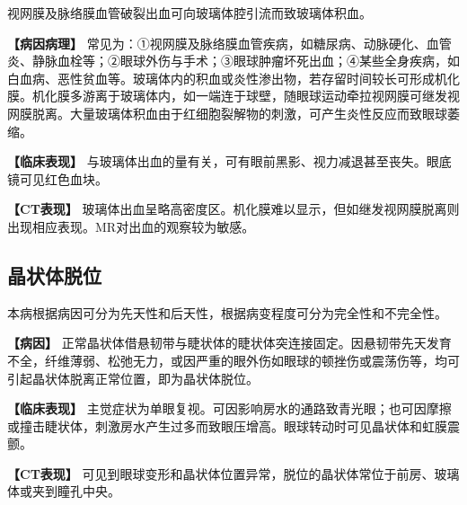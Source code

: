 视网膜及脉络膜血管破裂出血可向玻璃体腔引流而致玻璃体积血。

\textbf{【病因病理】}
常见为：①视网膜及脉络膜血管疾病，如糖尿病、动脉硬化、血管炎、静脉血栓等；②眼球外伤与手术；③眼球肿瘤坏死出血；④某些全身疾病，如白血病、恶性贫血等。玻璃体内的积血或炎性渗出物，若存留时间较长可形成机化膜。机化膜多游离于玻璃体内，如一端连于球壁，随眼球运动牵拉视网膜可继发视网膜脱离。大量玻璃体积血由于红细胞裂解物的刺激，可产生炎性反应而致眼球萎缩。

\textbf{【临床表现】}
与玻璃体出血的量有关，可有眼前黑影、视力减退甚至丧失。眼底镜可见红色血块。

\textbf{【CT表现】}
玻璃体出血呈略高密度区。机化膜难以显示，但如继发视网膜脱离则出现相应表现。MR对出血的观察较为敏感。

\subsection{晶状体脱位}

本病根据病因可分为先天性和后天性，根据病变程度可分为完全性和不完全性。

\textbf{【病因】}
正常晶状体借悬韧带与睫状体的睫状体突连接固定。因悬韧带先天发育不全，纤维薄弱、松弛无力，或因严重的眼外伤如眼球的顿挫伤或震荡伤等，均可引起晶状体脱离正常位置，即为晶状体脱位。

\textbf{【临床表现】}
主觉症状为单眼复视。可因影响房水的通路致青光眼；也可因摩擦或撞击睫状体，刺激房水产生过多而致眼压增高。眼球转动时可见晶状体和虹膜震颤。

\textbf{【CT表现】}
可见到眼球变形和晶状体位置异常，脱位的晶状体常位于前房、玻璃体或夹到瞳孔中央。

\protect\hypertarget{text00011.html}{}{}


